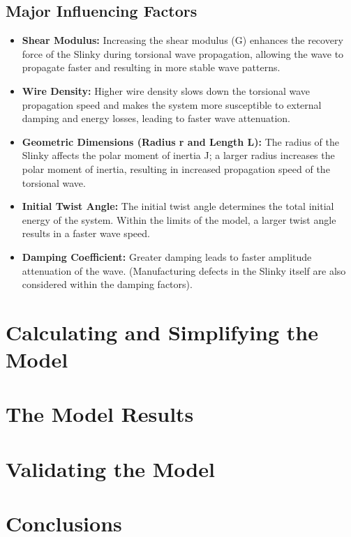 \documentclass{mcmthesis}  %
\begin{document}
\subsection{Major Influencing Factors}
\begin{itemize}
    \item \textbf{Shear Modulus:} Increasing the shear modulus (G) enhances the recovery force of the Slinky during torsional wave propagation, allowing the wave to propagate faster and resulting in more stable wave patterns.
    
    \item \textbf{Wire Density:} Higher wire density slows down the torsional wave propagation speed and makes the system more susceptible to external damping and energy losses, leading to faster wave attenuation.
    
    \item \textbf{Geometric Dimensions (Radius r and Length L):} The radius of the Slinky affects the polar moment of inertia J; a larger radius increases the polar moment of inertia, resulting in increased propagation speed of the torsional wave.
    
    \item \textbf{Initial Twist Angle:} The initial twist angle determines the total initial energy of the system. Within the limits of the model, a larger twist angle results in a faster wave speed.
    
    \item \textbf{Damping Coefficient:} Greater damping leads to faster amplitude attenuation of the wave. (Manufacturing defects in the Slinky itself are also considered within the damping factors).
\end{itemize}

\section{Calculating and Simplifying the Model}  %

\section{The Model Results}  %

\section{Validating the Model}  %

\section{Conclusions}  %
\end{document}
